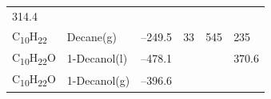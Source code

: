 \documentclass[
]{book}
\theoremstyle{definition}
\theoremstyle{definition}
\theoremstyle{definition}
\theoremstyle{remark}
\begin{document}
\begin{longtable}[]{@{}llllll@{}}
\begin{minipage}[t]{0.14\columnwidth}
314.4\strut
\end{minipage}\tabularnewline
\begin{minipage}[t]{0.07\columnwidth}\raggedright
C\textsubscript{10}H\textsubscript{22}\strut
\end{minipage} & \begin{minipage}[t]{0.17\columnwidth}\raggedright
Decane(g)\strut
\end{minipage} & \begin{minipage}[t]{0.15\columnwidth}\raggedright
--249.5\strut
\end{minipage} & \begin{minipage}[t]{0.15\columnwidth}\raggedright
33\strut
\end{minipage} & \begin{minipage}[t]{0.14\columnwidth}\raggedright
545\strut
\end{minipage} & \begin{minipage}[t]{0.14\columnwidth}\raggedright
235\strut
\end{minipage}\tabularnewline
\begin{minipage}[t]{0.07\columnwidth}\raggedright
C\textsubscript{10}H\textsubscript{22}O\strut
\end{minipage} & \begin{minipage}[t]{0.17\columnwidth}\raggedright
1-Decanol(l)\strut
\end{minipage} & \begin{minipage}[t]{0.15\columnwidth}\raggedright
--478.1\strut
\end{minipage} & \begin{minipage}[t]{0.15\columnwidth}\raggedright
\strut
\end{minipage} & \begin{minipage}[t]{0.14\columnwidth}\raggedright
\strut
\end{minipage} & \begin{minipage}[t]{0.14\columnwidth}\raggedright
370.6\strut
\end{minipage}\tabularnewline
\begin{minipage}[t]{0.07\columnwidth}\raggedright
C\textsubscript{10}H\textsubscript{22}O\strut
\end{minipage} & \begin{minipage}[t]{0.17\columnwidth}\raggedright
1-Decanol(g)\strut
\end{minipage} & \begin{minipage}[t]{0.15\columnwidth}\raggedright
--396.6\strut
\end{minipage} & \begin{minipage}[t]{0.15\columnwidth}\raggedright

\end{minipage}
\end{longtable}
\end{document}
